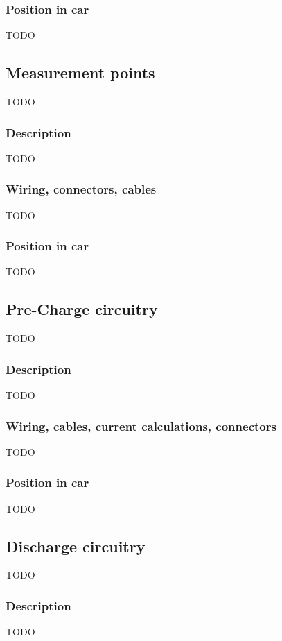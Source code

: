 \documentclass{article}
\begin{document}
\subsubsection{Position in car}
TODO

\subsection{Measurement points}
TODO

\subsubsection{Description}
TODO

\subsubsection{Wiring, connectors, cables}
TODO

\subsubsection{Position in car}
TODO

\subsection{Pre-Charge circuitry}
TODO

\subsubsection{Description}
TODO

\subsubsection{Wiring, cables, current calculations, connectors}
TODO

\subsubsection{Position in car}
TODO

\subsection{Discharge circuitry}
TODO

\subsubsection{Description}
TODO
\end{document}
